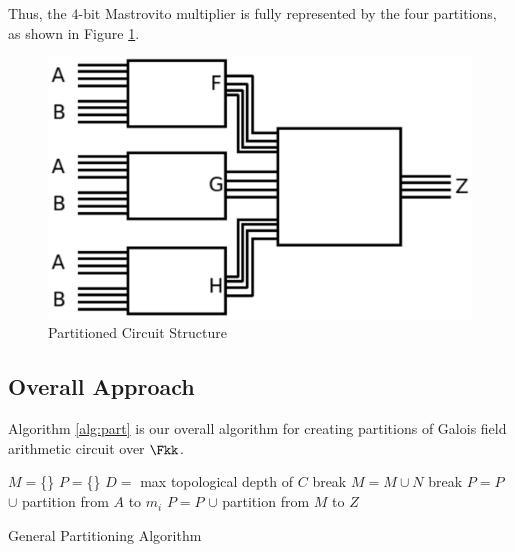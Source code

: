 \begin{Example}
Thus, the $4$-bit Mastrovito multiplier is fully represented by the four
partitions, as shown in Figure \ref{fig:partitions}.

\begin{figure}[H]
	\begin{center}
	\includegraphics[scale=0.7]{figures/partitions.eps}
	\end{center}
	\caption{Partitioned Circuit Structure}
	\label{fig:partitions}
\end{figure}
\label{exp:mul4partlast}
\end{Example}

\subsection{Overall Approach}
Algorithm \ref{alg:part} is our overall algorithm for creating partitions of 
Galois field arithmetic circuit over $\Fkk$. 

\begin{algorithm}[H]
\SetAlgoNoLine
  $M = $\xspace\{\}\;
  $P = $\xspace\{\}\;
  $D = $ max topological depth of $C$\;
  {
    {
      {
        break\;
      }
      {
        $M = M \cup N$\;
        break\;
      }
    }
  }
  {
  	$P = P$ \xspace$\cup$ partition from $A$ to $m_i$
  }
  $P = P$ \xspace$\cup$ partition from $M$ to $Z$
\caption {General Partitioning Algorithm}\label{alg:part}
\end{algorithm}

